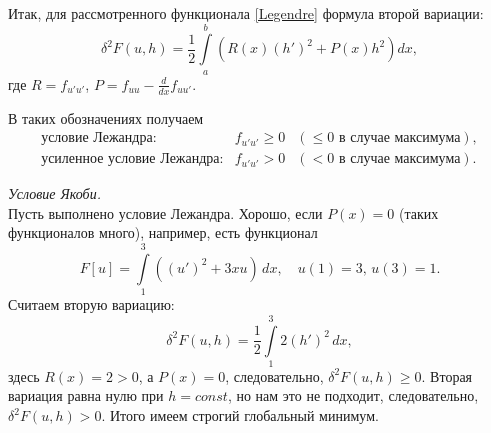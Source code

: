 \documentclass[12pt,a5paper]{book}
\begin{document}
	Итак, для рассмотренного функционала \eqref{Legendre} формула второй вариации:
	\begin{equation}\label{Legendre_2nd_var}
		\delta^2F(u,h) = \frac{1}{2}\int\limits_a^b \left(R(x)\left(h'\right)^2 + P(x)h^2\right)dx,
	\end{equation}
	где $R = f_{u'u'}$, $P = f_{uu} - \frac{d}{dx}f_{uu'}$.
	
	В таких обозначениях получаем
	\begin{equation*}
		\begin{array}{lcl}
			\text{условие Лежандра:} & f_{u'u'} \geq 0 & (\leq 0 \text{ в случае максимума}), \\
			\text{усиленное условие Лежандра:} & f_{u'u'} > 0 & (< 0 \text{ в случае максимума}).
		\end{array}
	\end{equation*}
	
	\emph{Условие Якоби.}\\
	Пусть выполнено условие Лежандра. Хорошо, если $P(x) = 0$ (таких функционалов много), например, есть функционал 
	\begin{equation*}
		F[u] = \int\limits_1^3\left(\left(u'\right)^2+3xu\right)\,dx, \quad u(1)=3,\, u(3)=1.
	\end{equation*} Считаем вторую вариацию:
	\begin{equation*}
		\delta^2F(u,h) = \frac{1}{2}\int\limits_1^3 2\left(h'\right)^2\,dx,
	\end{equation*}
	здесь $R(x) = 2 > 0$, а $P(x) = 0$, следовательно, $\delta^2F(u,h) \geq 0$. Вторая вариация равна нулю при $h = const$, но нам это не подходит, следовательно, $\delta^2F(u,h) > 0$. Итого имеем строгий глобальный минимум.
	
\end{document}
